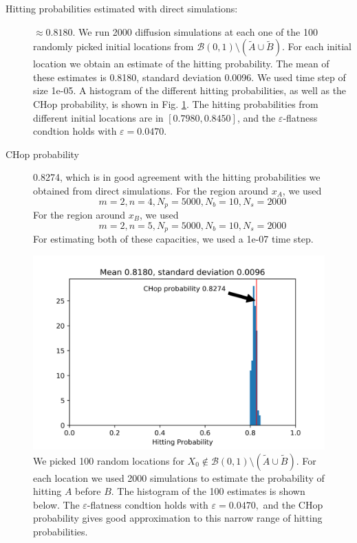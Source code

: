 



\begin{description}
\item[Hitting probabilities estimated with direct simulations:] $\approx 0.8180$.  We run 2000 diffusion simulations at each one of the 100 randomly picked initial locations from $\mathcal{B}(0, 1) \setminus (\tilde{A} \cup \tilde{B})$. For each initial location we obtain an estimate of the hitting probability. The mean of these estimates is 0.8180, standard deviation 0.0096. We used time step of size 1e-05. A histogram of the different hitting probabilities, as well as the CHop probability, is shown in Fig. \ref{fig:nontrivial_hitting_prob_test}. The hitting probabilities from different initial locations are in $[0.7980, 0.8450]$, and the $\varepsilon$-flatness condtion holds with $\varepsilon = 0.0470$.

\item[CHop probability]  0.8274, which is in good agreement with the hitting probabilities we obtained from direct simulations. For the region around $x_A$, we used
\begin{equation*}
m = 2, n = 4, 
N_p = 5000, N_b = 10,
N_s = 2000
\end{equation*}
For the region around $x_B$, we used
\begin{equation*}
m = 2, n = 5, 
N_p = 5000, N_b = 10,
N_s = 2000
\end{equation*}
For estimating both of these capacities, we used a 1e-07 time step.
\end{description}

\begin{figure}
	\caption{\label{fig:nontrivial_hitting_prob_test} We picked 100 random locations for $ X_0 \not\in \mathcal{B}(0, 1) \setminus (\tilde{A} \cup \tilde{B})$. For each location we used 2000 simulations to estimate the probability of hitting $A$ before $B$. The histogram of the 100 estimates is shown below. The $\varepsilon$-flatness condtion holds with $\varepsilon = 0.0470,$ and the CHop probability gives good approximation to this narrow range of hitting probabilities.}
	\includegraphics{figs/nontrivial_hitting_prob_hist.png}
\end{figure}
